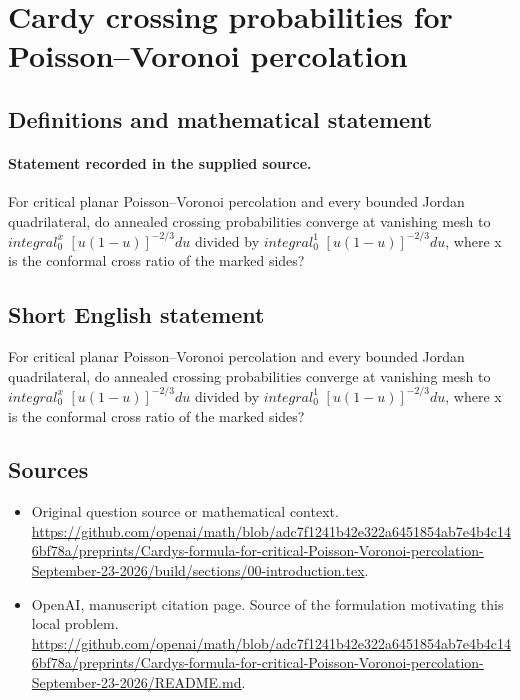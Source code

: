 \documentclass[11pt]{article}
\begin{document}
\section*{Cardy crossing probabilities for Poisson–Voronoi percolation}\label{30007405}
\subsection{Definitions and mathematical statement}
\paragraph{Statement recorded in the supplied source.}
For critical planar Poisson–Voronoi percolation and every bounded Jordan quadrilateral, do annealed crossing probabilities converge at vanishing mesh to $integral_0^x$ $[u(1-u)]^{-2/3}du$ divided by $integral_0^1$ $[u(1-u)]^{-2/3}du$, where x is the conformal cross ratio of the marked sides?
\subsection{Short English statement}
For critical planar Poisson–Voronoi percolation and every bounded Jordan quadrilateral, do annealed crossing probabilities converge at vanishing mesh to $integral_0^x$ $[u(1-u)]^{-2/3}du$ divided by $integral_0^1$ $[u(1-u)]^{-2/3}du$, where x is the conformal cross ratio of the marked sides?
\subsection{Sources}
\begin{itemize}
\item[S1] Original question source or mathematical context.
\url{https://github.com/openai/math/blob/adc7f1241b42e322a6451854ab7e4b4c146bf78a/preprints/Cardys-formula-for-critical-Poisson-Voronoi-percolation-September-23-2026/build/sections/00-introduction.tex}.
\item[S2] OpenAI, manuscript citation page. Source of the formulation motivating this local problem.
\url{https://github.com/openai/math/blob/adc7f1241b42e322a6451854ab7e4b4c146bf78a/preprints/Cardys-formula-for-critical-Poisson-Voronoi-percolation-September-23-2026/README.md}.
\end{itemize}
\end{document}
